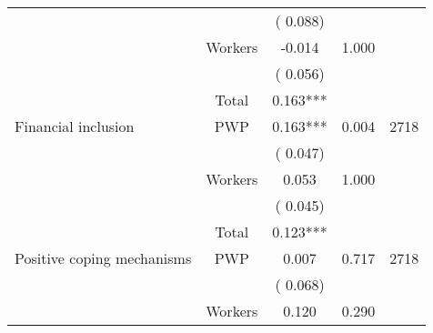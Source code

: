 \begin{tabular}{l*{4}{c}}
                               &                               &       (       0.088)                              & &                                                                             \\ 
                               &       Workers         &             -0.014                 &        1.000    &                                               \\ 
                               &                               &       (       0.056)                              & &                                                                             \\ 
\cmidrule{2-3}
                               &       Total           &              0.163***                 &    &                                               \\ 
\cmidrule{2-3}
 Financial inclusion                 &       PWP     &              0.163***                 &        0.004    & 2718                               \\ 
                               &                               &       (       0.047)                              & &                                                                             \\ 
                               &       Workers         &              0.053                 &        1.000    &                                               \\ 
                               &                               &       (       0.045)                              & &                                                                             \\ 
\cmidrule{2-3}
                               &       Total           &              0.123***                 &    &                                               \\ 
\cmidrule{2-3}
 Positive coping mechanisms                 &       PWP     &              0.007                 &        0.717    & 2718                               \\ 
                               &                               &       (       0.068)                              & &                                                                             \\ 
                               &       Workers         &              0.120               &        0.290   &                                               \\ 

\end{tabular}
